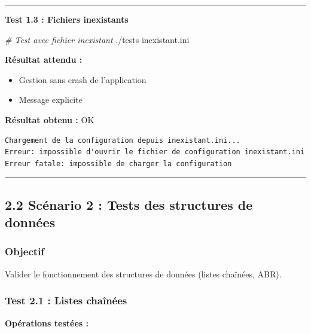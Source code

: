 \documentclass[
]{article}
\newcommand{\OK}{OK~\twemoji{white_check_mark}}
\newcommand{\OK}{OK~\twemoji{white_check_mark}}
\newenvironment{Shaded}{}{}
\newcommand{\CommentTok}[1]{\textcolor[rgb]{0.38,0.63,0.69}{\textit{#1}}}
\newcommand{\ExtensionTok}[1]{#1}
\newcommand{\NormalTok}[1]{#1}
\providecommand{\tightlist}{%
  \setlength{\itemsep}{0pt}\setlength{\parskip}{0pt}}
\begin{document}
\begin{center}\rule{0.5\linewidth}{0.5pt}\end{center}

\textbf{Test 1.3 : Fichiers inexistants}

\begin{Shaded}
\begin{Highlighting}[]
\CommentTok{\# Test avec fichier inexistant}
\ExtensionTok{./tests}\NormalTok{ inexistant.ini}
\end{Highlighting}
\end{Shaded}

\textbf{Résultat attendu :}

\begin{itemize}
\tightlist
\item
  Gestion sans crash de l'application
\item
  Message explicite
\end{itemize}

\textbf{Résultat obtenu :} \OK

\begin{verbatim}
Chargement de la configuration depuis inexistant.ini...
Erreur: impossible d'ouvrir le fichier de configuration inexistant.ini
Erreur fatale: impossible de charger la configuration
\end{verbatim}

\begin{center}\rule{0.5\linewidth}{0.5pt}\end{center}

\subsection{2.2 Scénario 2 : Tests des structures de
données}\label{scuxe9nario-2-tests-des-structures-de-donnuxe9es}

\subsubsection{Objectif}\label{objectif-1}

Valider le fonctionnement des structures de données (listes chaînées,
ABR).

\subsubsection{Test 2.1 : Listes
chaînées}\label{test-2.1-listes-chauxeenuxe9es}

\textbf{Opérations testées :}
\end{document}
